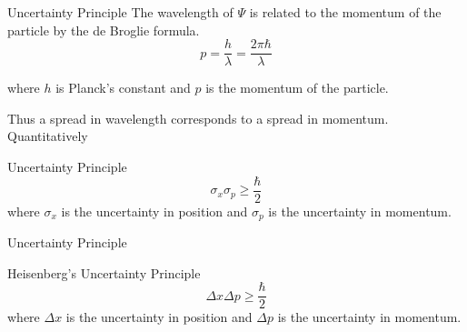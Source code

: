 \begin{frame}{Uncertainty Principle}
The wavelength of $\Psi$ is related to the momentum of the particle by the de Broglie formula.
$$ p = \frac{h}{\lambda} = \frac{2\pi \hbar}{\lambda}$$

where $h$ is Planck's constant and $p$ is the momentum of the particle.

Thus a spread in wavelength corresponds to a spread in momentum. Quantitatively
\begin{block}{Uncertainty Principle}
	\begin{equation*}
		\sigma_x \sigma_p \ge \frac{\hbar}{2}
	\end{equation*}
	where $\sigma_x$ is the uncertainty in position and $\sigma_p$ is the uncertainty in momentum.
\end{block}






\end{frame}

\begin{frame}{Uncertainty Principle}
	\begin{block}{Heisenberg's Uncertainty Principle}
		\begin{equation*}
			\Delta x \Delta p \geq \frac{\hbar}{2}
		\end{equation*}
		where $\Delta x$ is the uncertainty in position and $\Delta p$ is the uncertainty in momentum.
	\end{block}
\end{frame}






